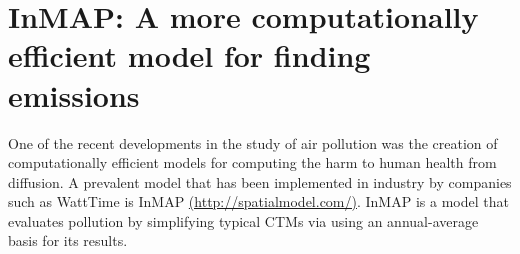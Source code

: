 \documentclass{article}
\begin{document}
\section{InMAP: A more computationally efficient model for finding emissions}

One of the recent developments in the study of air pollution was the creation of computationally efficient models for computing the harm to human health from
diffusion. A prevalent model that has been implemented in industry by companies such as WattTime is InMAP \url{(http://spatialmodel.com/)}. 
InMAP is a model that evaluates pollution by simplifying typical CTMs via using an annual-average basis for its results. 
\end{document}

